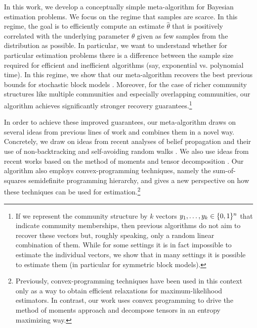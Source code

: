 %
In this work, we develop a conceptually simple meta-algorithm for Bayesian estimation problems.
We focus on the regime that samples are scarce.
In this regime, the goal is to efficiently compute an estimate $\hat \theta$ that is positively correlated with the underlying parameter $\theta$ given as few samples from the distribution as possible.
In particular, we want to understand whether for particular estimation problems there is a difference between the sample size required for efficient and inefficient algorithms (say, exponential vs. polynomial time).
In this regime, we show that our meta-algorithm recovers the best previous bounds for stochastic block models \cite{DBLP:conf/stoc/Massoulie14,DBLP:conf/stoc/MosselNS15,DBLP:conf/nips/AbbeS16}.
Moreover, for the case of richer community structures like multiple communities and especially overlapping communities, our algorithm achieves significantly stronger recovery guarantees.\footnote{
  If we represent the community structure by $k$ vectors $y_1,\ldots,y_k \in \{0,1\}^n$ that indicate community memberships, then previous algorithms \cite{DBLP:conf/nips/AbbeS16} do not aim to recover these vectors but, roughly speaking, only a random linear combination of them.
  While for some settings it is in fact impossible to estimate the individual vectors, we show that in many settings it is possible to estimate them (in particular for symmetric block models).}

%
In order to achieve these improved guarantees, our meta-algorithm draws on several ideas from previous lines of work and combines them in a novel way.
Concretely, we draw on ideas from recent analyses of belief propagation and their use of non-backtracking and self-avoiding random walks \cite{DBLP:conf/stoc/Massoulie14,DBLP:conf/stoc/MosselNS15,DBLP:conf/nips/AbbeS16}.
We also use ideas from recent works based on the method of moments and tensor decomposition \cite{DBLP:journals/jmlr/AnandkumarGHKT14,DBLP:journals/jmlr/AnandkumarGHK14, DBLP:conf/stoc/BarakKS15}.
Our algorithm also employs convex-programming techniques, namely the sum-of-squares semidefinite programming hierarchy, and gives a new perspective on how these techniques can be used for estimation.\footnote{
  Previously, convex-programming techniques have been used in this context only as a way to obtain efficient relaxations for maximum-likelihood estimators.
  In contrast, our work uses convex programming to drive the method of moments approach and decompose tensors in an entropy maximizing way.
}

